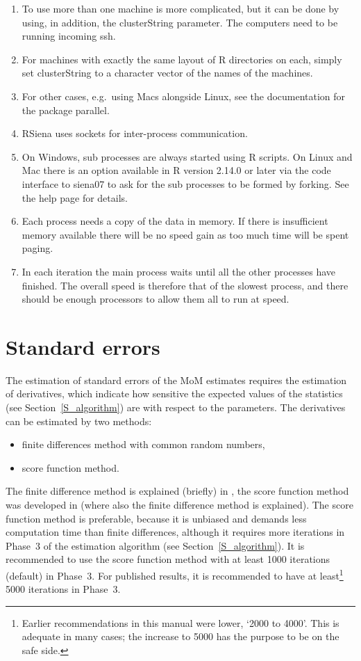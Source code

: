 \documentclass[a4paper,fleqn,11pt]{article}
\newcommand{\+}{\, + \,}
\newcommand{\sfn}[1]{\textsf{#1}}
\newcommand{\R}{{\sf R }}
\newcommand{\RS}{{\sf \textsf{RSiena} }}
\begin{document}
\begin{enumerate}
\item To use more than one machine is more complicated, but it can be done by
  using, in addition, the \sfn{clusterString} parameter.  The computers need to
  be running incoming \sfn{ssh}.
\item For machines with exactly the same layout of \R
  directories on each, simply set \sfn{clusterString} to a character vector of
  the names of the machines.
\item For other cases, e.g.\ using Macs alongside Linux,
  see the documentation for the package \sfn{parallel}.

\item \RS uses sockets for inter-process communication.
\item On Windows, sub processes are always started using \R scripts. On Linux
  and Mac there is an option available in \R version 2.14.0 or later via the
  code interface to \textsf{siena07} to ask for the sub processes to be formed by
  forking. See the help page for details.
\item Each process needs a copy of the data in memory. If there is insufficient
  memory available there will be no speed gain as too much time will be spent
  paging.
\item In each iteration the main process waits until all the other processes
  have finished. The overall speed is therefore that of the slowest process, and
  there should be enough processors to allow them all to run at speed.
\end{enumerate}




\newpage
\hypertarget{T_se}{
\section{Standard errors}
}
\label{S_se}

The estimation of standard errors of the MoM estimates requires
the estimation of derivatives,
which indicate how sensitive the expected values of the statistics
(see Section~\ref{S_algorithm}) are with respect to the parameters.
The derivatives can be estimated by two methods:
\begin{itemize}
\item finite differences method with common random numbers,
\item score function method.
\end{itemize}
The finite difference method is explained (briefly) in \citet{Snijders01},
the score function method was developed in \citet{SchweinbergerSnijders07a}
(where also the finite difference method is explained).
The score function method is preferable, because it is unbiased
and demands less computation time than finite differences,
although it requires more iterations in Phase~3 of the estimation algorithm
(see Section~\ref{S_algorithm}).
It is recommended to use the score function method with
at least 1000 iterations (default) in Phase~3.  For
published results, it is recommended to have at least\footnote{Earlier
recommendations in this manual were lower, `2000 to 4000'.
This is adequate in many cases; the increase to 5000 has the purpose
to be on the safe side.} 5000 iterations in Phase~3.
\end{document}
